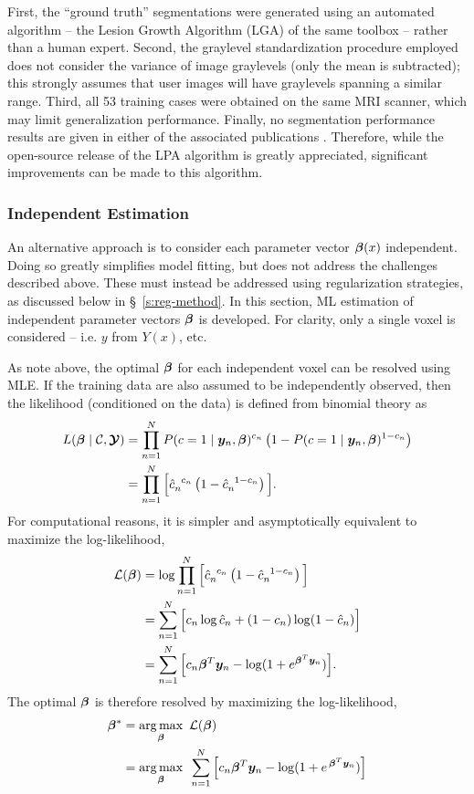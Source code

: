 First, the ``ground truth'' segmentations were generated using an automated algorithm -- the Lesion Growth Algorithm (LGA) \cite{Schmidt2012} of the same toolbox -- rather than a human expert.
Second, the graylevel standardization procedure employed does not consider the variance of image graylevels (only the mean is subtracted); this strongly assumes that user images will have graylevels spanning a similar range.
Third, all 53 training cases were obtained on the same MRI scanner, which may limit generalization performance.
Finally, no segmentation performance results are given in either of the associated publications \cite{Schmidt2017,Schmidt2017a}.
Therefore, while the open-source release of the LPA algorithm is greatly appreciated, significant improvements can be made to this algorithm.
\subsubsection{Independent Estimation}
An alternative approach is to consider each parameter vector $\bm{\beta}(x)$ independent. Doing so greatly simplifies model fitting, but does not address the challenges described above. These must instead be addressed using regularization strategies, as discussed below in \S\ \ref{s:reg-method}. In this section, ML estimation of independent parameter vectors $\bm{\beta}$ is developed. For clarity, only a single voxel is considered -- i.e. $y$ from $Y(x)$, etc.
\par
As note above, the optimal $\bm{\beta}$ for each independent voxel can be resolved using MLE. If the training data are also assumed to be independently observed, then the likelihood (conditioned on the data) is defined from binomial theory as
\begin{align}
  L(\bm{\beta}\mid\mathcal{C},\bm{\mathcal{Y}}) &= \prod_{n=1}^{N} P(c=1\mid\bm{y}_n,\bm{\beta})^{c_n} \left(1-P(c=1\mid\bm{y}_n,\bm{\beta})^{1-c_n}\right)\nonumber\\
  &= \prod_{n=1}^{N} \Big[\hat{c}_n^{\enspace c_n} \left(1-\hat{c}_n^{\enspace 1-c_n}\right)\Big].
  \label{eq:likelihood}
\end{align}
For computational reasons, it is simpler and asymptotically equivalent to maximize the log-likelihood,
\begin{align}
\mathcal{L}(\bm{\beta}) &= \log{ \prod_{n=1}^{N} \Big[\hat{c}_n^{\enspace c_n} \left(1-\hat{c}_n^{\enspace1-c_n}\right)\Big] }\nonumber\\
&= \sum_{n=1}^{N} \Big[ c_n \log \hat{c}_n + (1-c_n) \log (1-\hat{c}_n) \Big] \nonumber\\
&= \sum_{n=1}^{N} \Big[ c_n \bm{\beta}^T\bm{y}_n - \log (1+e^{\bm{\beta}^T\bm{y}_n}) \Big].
\label{eq:loglikelihood}
\end{align}
The optimal $\bm{\beta}$ is therefore resolved by maximizing the log-likelihood,
\begin{align}
\bm{\beta}^* &= \underset{\bm{\beta}}{\arg\max} \enspace\mathcal{L}(\bm{\beta})\nonumber\\
&= \underset{\bm{\beta}}{\arg\max}\enspace\sum_{n=1}^{N} \Big[ c_n \bm{\beta}^T\bm{y}_n - \log (1+e^{\thinspace\bm{\beta}^T\bm{y}_n}) \Big]
\label{eq:argmaxmle}
\end{align}
